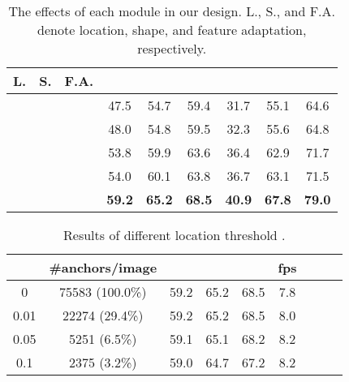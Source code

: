 \documentclass[10pt,twocolumn,letterpaper]{article}
\begin{document}
\begin{table}[t]
	\centering
	\caption{\small{The effects of each module in our design. L., S., and F.A. denote location, shape, and feature adaptation, respectively.}}
		\addtolength{\tabcolsep}{-2pt}
	\small{
		\begin{tabular}{*{9}{c}}
			\toprule
			L.   & S.      & F.A. &  &  &  &  &  &  \\
			\midrule
			           &            &                  & 47.5              & 54.7              & 59.4               & 31.7            & 55.1            & 64.6            \\
			\checkmark &            &                  & 48.0              & 54.8              & 59.5               & 32.3            & 55.6            & 64.8            \\
			           & \checkmark &                  & 53.8              & 59.9              & 63.6               & 36.4            & 62.9            & 71.7            \\
			\checkmark & \checkmark &                  & 54.0              & 60.1              & 63.8               & 36.7            & 63.1            & 71.5            \\
			\checkmark & \checkmark & \checkmark       & \textbf{59.2}     & \textbf{65.2}     & \textbf{68.5}      & \textbf{40.9}   & \textbf{67.8}   & \textbf{79.0}   \\
			\bottomrule
		\end{tabular}
	}
	\vspace{-5pt}
	\label{tab:components}
\end{table}


\begin{table}[t]
	\centering
	\caption{\small{Results of different location threshold .}}
	\addtolength{\tabcolsep}{-2pt}
	\small{
		\begin{tabular}{*{9}{c}}
			\toprule
			 & \#anchors/image &  &  &  & fps \\
			\midrule
			0         & 75583 (100.0\%) & 59.2              & 65.2              & 68.5               & 7.8 \\
			0.01      & 22274 (29.4\%)  & 59.2              & 65.2              & 68.5               & 8.0 \\
			0.05      & 5251 (6.5\%)    & 59.1              & 65.1              & 68.2               & 8.2 \\
			0.1       & 2375 (3.2\%)    & 59.0              & 64.7              & 67.2               & 8.2 \\
			\bottomrule
		\end{tabular}
	}
	\vspace{-5pt}
	\label{tab:location-thr}
\end{table}
\end{document}
